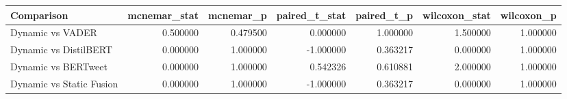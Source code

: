 \begin{tabular}{lrrrrrr}
\toprule
Comparison & mcnemar_stat & mcnemar_p & paired_t_stat & paired_t_p & wilcoxon_stat & wilcoxon_p \\
\midrule
Dynamic vs VADER & 0.500000 & 0.479500 & 0.000000 & 1.000000 & 1.500000 & 1.000000 \\
Dynamic vs DistilBERT & 0.000000 & 1.000000 & -1.000000 & 0.363217 & 0.000000 & 1.000000 \\
Dynamic vs BERTweet & 0.000000 & 1.000000 & 0.542326 & 0.610881 & 2.000000 & 1.000000 \\
Dynamic vs Static Fusion & 0.000000 & 1.000000 & -1.000000 & 0.363217 & 0.000000 & 1.000000 \\
\bottomrule
\end{tabular}
